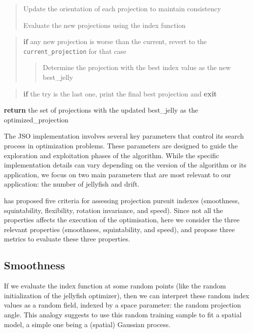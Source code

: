 \documentclass[
  number,
  preprint,
  3p]{elsarticle}
\begin{document}
\begin{tcolorbox}
\begin{quote}
Update the orientation of each projection to maintain consistency

Evaluate the new projections using the index function
\end{quote}

\begin{quote}
\textbf{if} any new projection is worse than the current, revert to the
\texttt{current\_projection} for that case

\begin{quote}
Determine the projection with the best index value as the new
best\_jelly
\end{quote}
\end{quote}

\begin{quote}
\textbf{if} the try is the last one, print the final best projection and
\textbf{exit}
\end{quote}

\textbf{return} the set of projections with the updated best\_jelly as
the optimized\_projection

\end{tcolorbox}

The JSO implementation involves several key parameters that control its
search process in optimization problems. These parameters are designed
to guide the exploration and exploitation phases of the algorithm. While
the specific implementation details can vary depending on the version of
the algorithm or its application, we focus on two main parameters that
are most relevant to our application: the number of jellyfish and drift.

\citet{laa_using_2020} has proposed five criteria for assessing
projection pursuit indexes (smoothness, squintability, flexibility,
rotation invariance, and speed). Since not all the properties affects
the execution of the optimisation, here we consider the three relevant
properties (smoothness, squintability, and speed), and propose three
metrics to evaluate these three properties.

\subsection{Smoothness}\label{sec-smoothness}

If we evaluate the index function at some random points (like the random
initialization of the jellyfish optimizer), then we can interpret these
random index values as a random field, indexed by a space parameter: the
random projection angle. This analogy suggests to use this random
training sample to fit a spatial model, a simple one being a (spatial)
Gaussian process.
\end{document}
